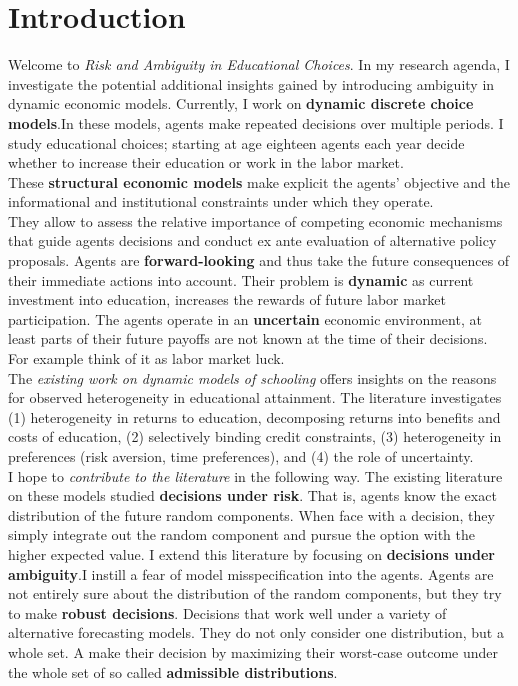 \section{Introduction}
Welcome to \textit{Risk and Ambiguity in Educational Choices}. In my research agenda, I investigate the potential additional insights gained by introducing ambiguity in dynamic economic models. Currently, I work on \textbf{dynamic discrete choice models}.In these models, agents make repeated decisions over multiple periods. I study educational choices; starting at age eighteen agents each year decide whether to increase their education or work in the labor market.\\\newline
%
These \textbf{structural economic models} make explicit the agents' objective and the informational and institutional constraints under which they operate.\\\newline 
%
They allow to assess the relative importance of competing economic mechanisms that guide agents decisions and conduct ex ante evaluation of alternative policy proposals. Agents are \textbf{forward-looking} and thus take the future consequences of their immediate actions into account.  Their problem is \textbf{dynamic} as current investment into education, increases the rewards of future labor market participation. The agents operate in an \textbf{uncertain} economic environment, at least parts of their future payoffs are not known at the time of their decisions. For example think of it as labor market luck.\\\newline
%
The \textit{existing work on dynamic models of schooling} offers insights on the reasons for observed heterogeneity in educational attainment. The literature investigates (1) heterogeneity in returns to education, decomposing returns into benefits and costs of education, (2) selectively binding credit constraints, (3) heterogeneity in preferences (risk aversion, time preferences), and (4) the role of uncertainty.\\\newline
%
I hope to \textit{contribute to the literature} in the following way. The existing literature on these models studied \textbf{decisions under risk}. That is, agents know the exact distribution of the future random components. When face with a decision, they simply integrate out the random component and pursue the option with the higher expected value. I extend this literature by focusing on \textbf{decisions under ambiguity}.I instill a fear of model misspecification into the agents. Agents are not entirely sure about the distribution of the random components, but they try to make \textbf{robust decisions}. Decisions that work well under a variety of alternative forecasting models. They do not only consider one distribution, but a whole set. A make their decision by maximizing their worst-case outcome under the whole set of so called \textbf{admissible distributions}.\\\newline

